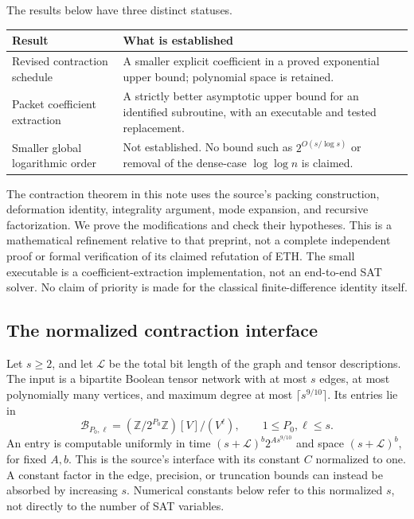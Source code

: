 \documentclass[11pt]{article}
\theoremstyle{remark}
\newcommand{\LL}{\mathcal L}
\begin{document}
The results below have three distinct statuses.
\begin{center}
\begin{tabular}{p{}p{}}
\toprule
Result & What is established\\
\midrule
Revised contraction schedule & A smaller explicit coefficient in a proved exponential upper bound; polynomial space is retained.\\
Packet coefficient extraction & A strictly better asymptotic upper bound for an identified subroutine, with an executable and tested replacement.\\
Smaller global logarithmic order & Not established. No bound such as $2^{O(s/\log s)}$ or removal of the dense-case $\log\log n$ is claimed.\\
\bottomrule
\end{tabular}
\end{center}

The contraction theorem in this note uses the source's packing construction, deformation identity, integrality argument, mode expansion, and recursive factorization. We prove the modifications and check their hypotheses. This is a mathematical refinement relative to that preprint, not a complete independent proof or formal verification of its claimed refutation of ETH. The small executable is a coefficient-extraction implementation, not an end-to-end SAT solver. No claim of priority is made for the classical finite-difference identity itself.

\subsection{The normalized contraction interface}

Let $s\ge2$, and let $\LL$ be the total bit length of the graph and tensor descriptions. The input is a bipartite Boolean tensor network with at most $s$ edges, at most polynomially many vertices, and maximum degree at most $\lceil s^{9/10}\rceil$. Its entries lie in
\[
 \mathcal B_{P_0,\ell}
  =(\mathbb Z/2^{P_0}\mathbb Z)[V]/(V^\ell),
 \qquad 1\le P_0,\ell\le s.
\]
An entry is computable uniformly in time $(s+\LL)^b2^{A s^{9/10}}$ and space $(s+\LL)^b$, for fixed $A,b$. This is the source's interface with its constant $C$ normalized to one. A constant factor in the edge, precision, or truncation bounds can instead be absorbed by increasing $s$. Numerical constants below refer to this normalized $s$, not directly to the number of SAT variables.
\end{document}

